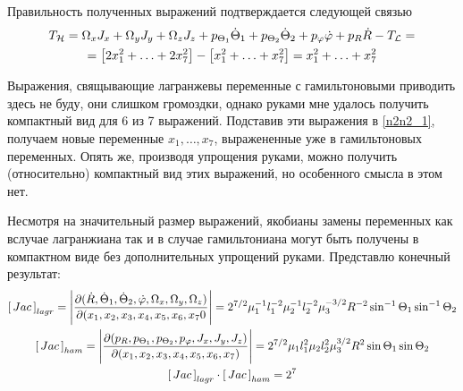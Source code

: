 \documentclass[12pt]{article}
\newcommand{\mL}{\mathcal{L}}
\newcommand{\mH}{\mathcal{H}}
\newcommand{\dR}{\dot{R}}
\newcommand{\JacL}{\left[ \, Jac \, \right]_{lagr}}
\newcommand{\JacH}{\left[ \, Jac \, \right]_{ham}}
\newcommand{\dtone}{\dot{\Theta}_1}
\newcommand{\dttwo}{\dot{\Theta}_2}
\newcommand{\ptone}{p_{\Theta_1}}
\newcommand{\pttwo}{p_{\Theta_2}}
\newcommand{\pphi}{p_{\varphi}}
\begin{document}
Правильность полученных выражений подтверждается следующей связью
\begin{gather}
		T_\mH = \Omega_x J_x + \Omega_y J_y + \Omega_z J_z + \ptone \dtone + \pttwo \dttwo + \pphi \dot{\varphi} + p_R \dot{R} - T_\mL = \notag \\
	= \left[ 2 x_1 ^2 + \ldots + 2 x_7^2 \right] - \left[ x_1^2 + \ldots + x_7^2 \right] = x_1^2 + \ldots + x_7^2 \notag
\end{gather}

Выражения, свящывающие лагранжевы переменные с гамильтоновыми приводить здесь не буду, они слишком громоздки, однако руками мне удалось получить компактный вид для 6 из 7 выражений. Подставив эти выражения в \eqref{n2n2_1}, получаем новые переменные $x_1, \ldots, x_7$, выражененные уже в гамильтоновых переменных. Опять же, производя упрощения руками, можно получить (относительно) компактный вид этих выражений, но особенного смысла в этом нет.  

Несмотря на значительный размер выражений, якобианы замены переменных как вслучае лагранжиана так и в случае гамильтониана могут быть получены в компактном виде без дополнительных упрощений руками. Представлю конечный результат:
\begin{gather}
		\JacL = \Bigg{|} \frac{\partial ( \dR, \dot{\Theta}_1, \dot{\Theta}_2, \dot{\varphi}, \Omega_x, \Omega_y, \Omega_z )}{\partial ( x_1, x_2, x_3, x_4, x_5, x_6, x_7 0} \Bigg{|} = 2^{7/2} \mu_1^{-1} l_1^{-2} \mu_2^{-1} l_2^{-2} \mu_3^{-3/2} R^{-2} \sin^{-1} \Theta_1 \sin^{-1} \Theta_2 \notag \\
		\JacH = \Bigg{|} \frac{\partial ( p_R, p_{\Theta_1}, p_{\Theta_2}, p_\varphi, J_x, J_y, J_z )}{\partial ( x_1, x_2, x_3, x_4, x_5, x_6, x_7) } \Bigg{|} = 2^{7/2} \mu_1 l_1^2 \mu_2 l_2^2 \mu_3^{3/2} R^2 \sin \Theta_1 \sin \Theta_2 \notag \\
		\JacL \cdot \JacH = 2^7 \notag
\end{gather}
\end{document}
